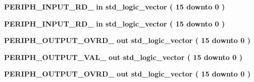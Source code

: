 \begin{DoxyCompactItemize}
\item 
{\bf P\+E\+R\+I\+P\+H\+\_\+\+I\+N\+P\+U\+T\+\_\+\+R\+D\+\_}  {\bfseries {\bfseries \textcolor{keywordflow}{in}\textcolor{vhdlchar}{ }}} {\bfseries \textcolor{comment}{std\+\_\+logic\+\_\+vector}\textcolor{vhdlchar}{ }\textcolor{vhdlchar}{(}\textcolor{vhdlchar}{ }\textcolor{vhdlchar}{ } \textcolor{vhdldigit}{15} \textcolor{vhdlchar}{ }\textcolor{keywordflow}{downto}\textcolor{vhdlchar}{ }\textcolor{vhdlchar}{ } \textcolor{vhdldigit}{0} \textcolor{vhdlchar}{ }\textcolor{vhdlchar}{)}\textcolor{vhdlchar}{ }} 
\item 
{\bf P\+E\+R\+I\+P\+H\+\_\+\+I\+N\+P\+U\+T\+\_\+\+R\+D\+\_}  {\bfseries {\bfseries \textcolor{keywordflow}{in}\textcolor{vhdlchar}{ }}} {\bfseries \textcolor{comment}{std\+\_\+logic\+\_\+vector}\textcolor{vhdlchar}{ }\textcolor{vhdlchar}{(}\textcolor{vhdlchar}{ }\textcolor{vhdlchar}{ } \textcolor{vhdldigit}{15} \textcolor{vhdlchar}{ }\textcolor{keywordflow}{downto}\textcolor{vhdlchar}{ }\textcolor{vhdlchar}{ } \textcolor{vhdldigit}{0} \textcolor{vhdlchar}{ }\textcolor{vhdlchar}{)}\textcolor{vhdlchar}{ }} 
\item 
{\bf P\+E\+R\+I\+P\+H\+\_\+\+O\+U\+T\+P\+U\+T\+\_\+\+O\+V\+R\+D\+\_}  {\bfseries {\bfseries \textcolor{keywordflow}{out}\textcolor{vhdlchar}{ }}} {\bfseries \textcolor{comment}{std\+\_\+logic\+\_\+vector}\textcolor{vhdlchar}{ }\textcolor{vhdlchar}{(}\textcolor{vhdlchar}{ }\textcolor{vhdlchar}{ } \textcolor{vhdldigit}{15} \textcolor{vhdlchar}{ }\textcolor{keywordflow}{downto}\textcolor{vhdlchar}{ }\textcolor{vhdlchar}{ } \textcolor{vhdldigit}{0} \textcolor{vhdlchar}{ }\textcolor{vhdlchar}{)}\textcolor{vhdlchar}{ }} 
\item 
{\bf P\+E\+R\+I\+P\+H\+\_\+\+O\+U\+T\+P\+U\+T\+\_\+\+V\+A\+L\+\_}  {\bfseries {\bfseries \textcolor{keywordflow}{out}\textcolor{vhdlchar}{ }}} {\bfseries \textcolor{comment}{std\+\_\+logic\+\_\+vector}\textcolor{vhdlchar}{ }\textcolor{vhdlchar}{(}\textcolor{vhdlchar}{ }\textcolor{vhdlchar}{ } \textcolor{vhdldigit}{15} \textcolor{vhdlchar}{ }\textcolor{keywordflow}{downto}\textcolor{vhdlchar}{ }\textcolor{vhdlchar}{ } \textcolor{vhdldigit}{0} \textcolor{vhdlchar}{ }\textcolor{vhdlchar}{)}\textcolor{vhdlchar}{ }} 
\item 
{\bf P\+E\+R\+I\+P\+H\+\_\+\+O\+U\+T\+P\+U\+T\+\_\+\+O\+V\+R\+D\+\_}  {\bfseries {\bfseries \textcolor{keywordflow}{out}\textcolor{vhdlchar}{ }}} {\bfseries \textcolor{comment}{std\+\_\+logic\+\_\+vector}\textcolor{vhdlchar}{ }\textcolor{vhdlchar}{(}\textcolor{vhdlchar}{ }\textcolor{vhdlchar}{ } \textcolor{vhdldigit}{15} \textcolor{vhdlchar}{ }\textcolor{keywordflow}{downto}\textcolor{vhdlchar}{ }\textcolor{vhdlchar}{ } \textcolor{vhdldigit}{0} \textcolor{vhdlchar}{ }\textcolor{vhdlchar}{)}\textcolor{vhdlchar}{ }} 

\end{DoxyCompactItemize}
